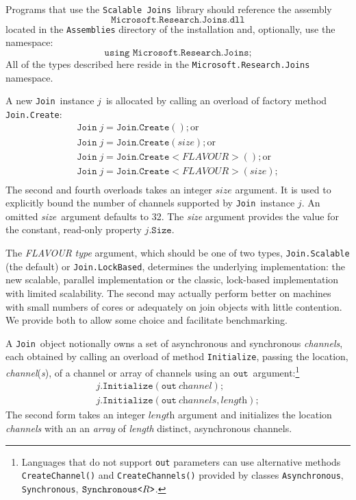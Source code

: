 \documentclass{article}
\newcommand{\sjoins}{{\texttt{Scalable Joins}}}
\newcommand{\cjoin}{{\texttt{Join}}}
\newcommand{\methodref}[1]{{\texttt{#1}}}
\newcommand{\dotinitialize}{\texttt{.Initialize}}
\newcommand{\dotsize}{\texttt{.Size}}
\newcommand{\joindotcreate}{\texttt{Join.Create}}
\newcommand{\Initialize}{\texttt{Initialize}}
\newcommand{\joinobj}{\ensuremath{j}}
\newcommand{\tvarr}{\ensuremath{R}}
\newcommand{\out}{\ensuremath{\texttt{out}}}
\begin{document}
Programs that use the \sjoins\ library should reference the assembly
\[ \texttt{Microsoft.Research.Joins.dll} \]
located in the \texttt{Assemblies} directory of the installation and, optionally, use the namespace:
\[ \texttt{using Microsoft.Research.Joins;} \]
All of the types described here reside in the \texttt{Microsoft.Research.Joins} namespace.

A new \cjoin\ instance \joinobj\ is allocated by calling an overload of factory method \methodref{Join.Create}:
\[ 
\begin{array}{lr}
  \cjoin\; \joinobj = \joindotcreate(); \mbox{or} \\ 
  \cjoin\; \joinobj = \joindotcreate(\textit{size});\mbox{or}\\
  \cjoin\; \joinobj = \joindotcreate<\textit{FLAVOUR}>(); \mbox{or}\\ 
  \cjoin\; \joinobj = \joindotcreate<\textit{FLAVOUR}>(\textit{size});\\
\end{array}
\]
\noindent The second and fourth overloads takes an integer $\textit{size}$ argument. It is used to explicitly bound the number of channels supported by 
\cjoin\ instance \joinobj. An omitted \textit{size}\ argument defaults to 32. 
The \textit{size} argument provides the value for the constant, read-only property $\joinobj\dotsize$.

The \textit{FLAVOUR} \emph{type} argument, which should be one of two types, \texttt{Join.Scalable} (the default) or \texttt{Join.LockBased},
determines the underlying implementation: the new scalable, parallel implementation or the classic, lock-based implementation with limited scalability. The second may actually perform
better on machines with small numbers of cores or adequately on join objects with little contention. We provide both to allow some choice and facilitate benchmarking.

A \cjoin\ object notionally owns a set of asynchronous and synchronous \emph{channels}, each obtained by calling an overload of
method \Initialize, passing the location, \textit{channel}(\textit{s}), of a channel or array of channels using an \out\ argument:\footnote{Languages that do not support \texttt{out} parameters can use alternative methods
\texttt{CreateChannel()} and \texttt{CreateChannels()} provided by classes \texttt{Asynchronous}, \texttt{Synchronous},
 $\texttt{Synchronous<\tvarr>}$.}
\[ 
\begin{array}{l}
  \joinobj\dotinitialize(\out\ \textit{channel});\\
  \joinobj\dotinitialize(\out\ \textit{channels}, \textit{length}); 
\end{array}
\]
\noindent The second form takes an integer $\textit{length}$ argument and initializes the location \textit{channels} with an 
an \emph{array} of \textit{length} distinct, asynchronous channels.
\end{document}
